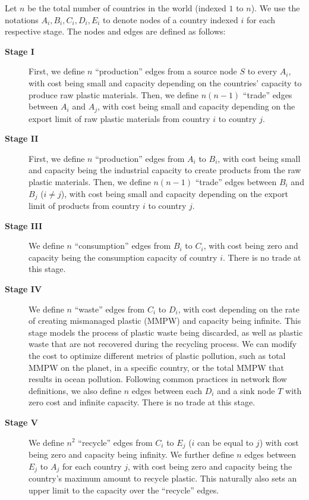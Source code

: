 Let $n$ be the total number of countries in the world (indexed $1$ to $n$). We use the notations $A_i, B_i, C_i, D_i, E_i$ to denote nodes of a country indexed $i$ for each respective stage.
The nodes and edges are defined as follows:
\begin{description}
    \item[\textbf{Stage I}] First, we define $n$ ``production'' edges from a source node $S$ to every $A_i$, with cost being small and capacity depending on the countries' capacity to produce raw plastic materials. Then, we define $n(n-1)$ ``trade'' edges between $A_i$ and $A_j$, with cost being small and capacity depending on the export limit of raw plastic materials from country $i$ to country $j$.
    \item[\textbf{Stage II}] First, we define $n$ ``production'' edges from $A_i$ to $B_i$, with cost being small and capacity being the industrial capacity to create products from the raw plastic materials.  Then, we define $n(n-1)$ ``trade'' edges between $B_i$ and $B_j$ ($i \neq j$), with cost being small and capacity depending on the export limit of products from country $i$ to country $j$. 
    \item [\textbf{Stage III}] We define $n$ ``consumption'' edges from $B_i$ to $C_i$, with cost being zero and capacity being the consumption capacity of country $i$. There is no trade at this stage.
    \item [\textbf{Stage IV}] We define $n$ ``waste'' edges from $C_i$ to $D_i$, with cost depending on the rate of creating mismanaged plastic (MMPW) and capacity being infinite. This stage models the process of plastic waste being discarded, as well as plastic waste that are not recovered during the recycling process.
    We can modify the cost to optimize different metrics of plastic pollution, such as total MMPW on the planet, in a specific country, or the total MMPW that results in ocean pollution. Following common practices in network flow definitions, we also define $n$ edges between each $D_i$ and a sink node $T$ with zero cost and infinite capacity. There is no trade at this stage.
    \item [\textbf{Stage V}] We define $n^2$ ``recycle'' edges from $C_i$ to $E_j$ ($i$ can be equal to $j$) with cost being zero and capacity being infinity. We further define $n$ edges between $E_j$ to $A_j$ for each country $j$, with cost being zero and capacity being the country's maximum amount to recycle plastic. This naturally also sets an upper limit to the capacity over the ``recycle'' edges. 
\end{description}


